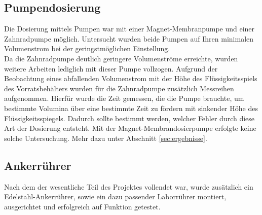 \subsection{Pumpendosierung}
Die Dosierung mittels Pumpen war mit einer Magnet-Membranpumpe und einer Zahnradpumpe möglich. 
Untersucht wurden beide Pumpen auf Ihren minimalen Volumenstrom bei der geringstmöglichen Einstellung.\\
Da die Zahnradpumpe deutlich geringere Volumenströme erreichte, wurden weitere Arbeiten lediglich mit dieser Pumpe vollzogen. Aufgrund der Beobachtung eines abfallenden Volumenstrom mit der Höhe des Flüssigkeitsspiels des Vorratsbehälters wurden für die Zahnradpumpe zusätzlich Messreihen aufgenommen. Hierfür wurde die Zeit gemessen, die die Pumpe brauchte, um bestimmte Volumina über eine bestimmte Zeit zu fördern mit sinkender Höhe des Flüssigkeitsspiegels. Dadurch sollte bestimmt werden, welcher Fehler durch diese Art der Dosierung entsteht. Mit der Magnet-Membrandosierpumpe erfolgte keine solche Untersuchung. Mehr dazu unter Abschnitt \ref{sec:ergebnisse}.

\subsection{Ankerrührer}
Nach dem der wesentliche Teil des Projektes vollendet war, wurde zusätzlich ein Edelstahl-Ankerrührer, sowie ein dazu passender Laborrührer montiert, ausgerichtet und erfolgreich auf Funktion getestet.
